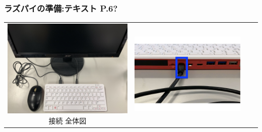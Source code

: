 \documentclass[dvipdfmx]{beamer}
\begin{document}
\begin{frame}[fragile]
	\frametitle{ラズパイの準備:テキスト P.6?~~~}

	\begin{tabular}{cccc}
		\begin{minipage}{0.23\textwidth}
    {\upshape
      \includegraphics[width=\textwidth]{connections01-2023.jpg}
      \newline
			接続 全体図} 
			\end{minipage} &
			\begin{minipage}{0.23\textwidth}
                    {\upshape
                      \includegraphics[width=\textwidth]{figure222023.pdf}
}
\end{minipage}
\end{tabular}
\end{frame}
\end{document}
